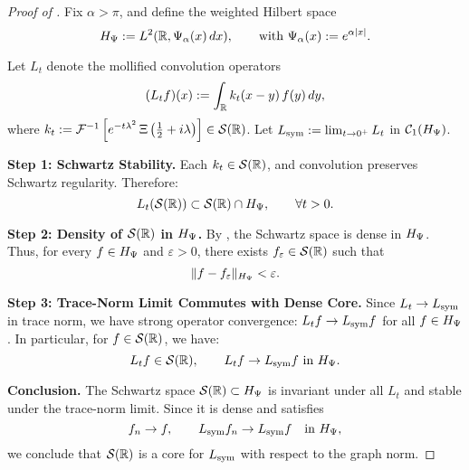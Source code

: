 \begin{proof}[Proof of ]
Fix \( \alpha > \pi \), and define the weighted Hilbert space
\[
H_{\Psi} := L^2(\mathbb{R}, \Psi_\alpha(x)\, dx), \qquad \text{with } \Psi_\alpha(x) := e^{\alpha |x|}.
\]

Let \( L_t \) denote the mollified convolution operators
\[
(L_t f)(x) := \int_{\mathbb{R}} k_t(x - y)\, f(y)\, dy,
\]
where \( k_t := \mathcal{F}^{-1}\left[ e^{-t\lambda^2} \, \Xi\left(\tfrac{1}{2} + i\lambda \right) \right] \in \mathcal{S}(\mathbb{R}) \). Let \( L_{\mathrm{sym}} := \lim_{t \to 0^+} L_t \) in \( \mathcal{C}_1(H_{\Psi}) \).

\medskip
\noindent\textbf{Step 1: Schwartz Stability.}
Each \( k_t \in \mathcal{S}(\mathbb{R}) \), and convolution preserves Schwartz regularity. Therefore:
\[
L_t(\mathcal{S}(\mathbb{R})) \subset \mathcal{S}(\mathbb{R}) \cap H_{\Psi}, \qquad \forall t > 0.
\]

\medskip
\noindent\textbf{Step 2: Density of \( \mathcal{S}(\mathbb{R}) \) in \( H_{\Psi} \).}
By , the Schwartz space is dense in \( H_{\Psi} \). Thus, for every \( f \in H_{\Psi} \) and \( \varepsilon > 0 \), there exists \( f_\varepsilon \in \mathcal{S}(\mathbb{R}) \) such that
\[
\|f - f_\varepsilon\|_{H_{\Psi}} < \varepsilon.
\]

\medskip
\noindent\textbf{Step 3: Trace-Norm Limit Commutes with Dense Core.}
Since \( L_t \to L_{\mathrm{sym}} \) in trace norm, we have strong operator convergence: \( L_t f \to L_{\mathrm{sym}} f \) for all \( f \in H_{\Psi} \). In particular, for \( f \in \mathcal{S}(\mathbb{R}) \), we have:
\[
L_t f \in \mathcal{S}(\mathbb{R}), \qquad L_t f \to L_{\mathrm{sym}} f \text{ in } H_{\Psi}.
\]

\medskip
\noindent\textbf{Conclusion.}
The Schwartz space \( \mathcal{S}(\mathbb{R}) \subset H_{\Psi} \) is invariant under all \( L_t \) and stable under the trace-norm limit. Since it is dense and satisfies
\[
f_n \to f, \qquad L_{\mathrm{sym}} f_n \to L_{\mathrm{sym}} f \quad \text{in } H_{\Psi},
\]
we conclude that \( \mathcal{S}(\mathbb{R}) \) is a core for \( L_{\mathrm{sym}} \) with respect to the graph norm.
\end{proof}
